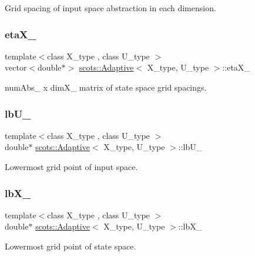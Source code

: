 Grid spacing of input space abstraction in each dimension. \mbox{\label{classscots_1_1Adaptive_abe9d5faea4bd01753070599200e224c5}} 
\subsubsection{\texorpdfstring{eta\+X\+\_\+}{etaX\_}}
{\footnotesize\ttfamily template$<$class X\+\_\+type , class U\+\_\+type $>$ \\
vector$<$double$\ast$$>$ \hyperlink{classscots_1_1Adaptive}{scots\+::\+Adaptive}$<$ X\+\_\+type, U\+\_\+type $>$\+::eta\+X\+\_\+}

num\+Abs\+\_\+ x dim\+X\+\_\+ matrix of state space grid spacings. \mbox{\label{classscots_1_1Adaptive_aebaf5b4abaa33f4494491cbe67b42b80}} 
\subsubsection{\texorpdfstring{lb\+U\+\_\+}{lbU\_}}
{\footnotesize\ttfamily template$<$class X\+\_\+type , class U\+\_\+type $>$ \\
double$\ast$ \hyperlink{classscots_1_1Adaptive}{scots\+::\+Adaptive}$<$ X\+\_\+type, U\+\_\+type $>$\+::lb\+U\+\_\+}

Lowermost grid point of input space. \mbox{\label{classscots_1_1Adaptive_a6018fcd45bd81cc0073f0bd1f375829d}} 
\subsubsection{\texorpdfstring{lb\+X\+\_\+}{lbX\_}}
{\footnotesize\ttfamily template$<$class X\+\_\+type , class U\+\_\+type $>$ \\
double$\ast$ \hyperlink{classscots_1_1Adaptive}{scots\+::\+Adaptive}$<$ X\+\_\+type, U\+\_\+type $>$\+::lb\+X\+\_\+}

Lowermost grid point of state space. \mbox{\label{classscots_1_1Adaptive_ac3f203003011bcea5176ef294ab7a8a0}} 
